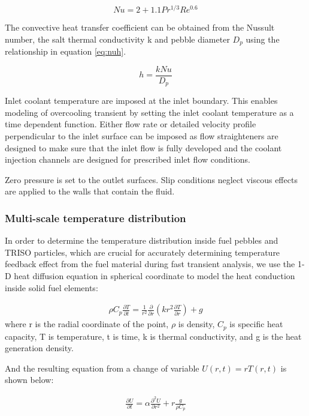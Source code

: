 \documentclass{elsarticle}
\begin{document}
\begin{equation}
  Nu = 2 + 1.1 Pr^{1/3}Re^{0.6} 
  \label{eq:wakao}
\end{equation}

The convective heat transfer coefficient can be obtained from the Nussult number, the salt thermal conductivity k and pebble diameter $D_p$ using the relationship in equation \ref{eq:nuh}.

\begin{equation}
  h = \frac{kNu}{D_p}
  \label{eq:nuh}
\end{equation}


Inlet coolant temperature are imposed at the inlet boundary.  This enables modeling of overcooling transient by setting the inlet coolant temperature as a time dependent function. Either flow rate or detailed velocity profile perpendicular to the inlet surface can be imposed as flow straighteners are designed to make sure that the inlet flow is fully developed and the coolant injection channels are designed for prescribed inlet flow conditions.

Zero pressure is set to the outlet surfaces. Slip conditions neglect viscous effects are applied to the walls that contain the fluid.  

\subsubsection{Multi-scale temperature distribution}

In order to determine the temperature distribution inside fuel pebbles and TRISO particles, which are crucial for accurately determining temperature feedback effect from the fuel material during fast transient analysis, we use the 1-D heat diffusion equation in spherical coordinate to model the heat conduction inside solid fuel elements:

\begin{align}
  \rho C_p\frac{\partial T}{\partial t} = \frac{1}{r^2}\frac{\partial}{\partial r}\left(kr^2\frac{\partial T}{\partial r}\right) + g
\end{align}
where r is the radial coordinate of the point, $\rho$ is density, $C_p$ is specific heat capacity, T is temperature, t is time, k is thermal conductivity, and g is the heat generation density.

And the resulting equation from a change of variable $U(r,t)=rT(r,t)$ is shown below:

\begin{align}
  \frac{\partial U}{\partial t} = \alpha \frac{\partial ^2 U}{\partial r^2} + r \frac{g}{\rho C_p}
\end{align}
\end{document}
